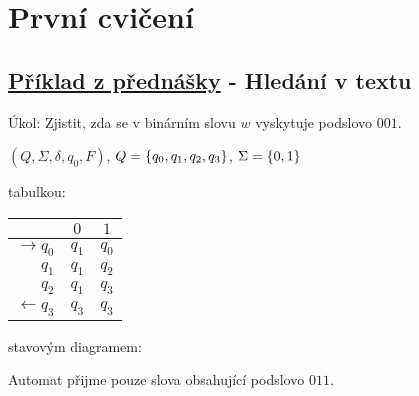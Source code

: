 \section{První cvičení}

\subsection{\href{https://youtu.be/i9kVAPzQyiU?list=PLQL6z4JeTTQkLuzI78OTnfYBclE1g0UjS&t=2918}{Příklad z přednášky} - Hledání v textu}
Úkol: Zjistit, zda se v binárním slovu $w$ vyskytuje podslovo $001$. 

$(Q, \Sigma, \delta, q_0, F)$, $Q = \left\lbrace q_0, q_1, q_2, q_3 \right\rbrace$, $\Sigma = \left\lbrace 0,1 \right\rbrace$ 

\begin{multicols}{2}

    tabulkou: 

    \begin{tabular}{|r|c|c|}
        \hline
        & $0$ & $1$\\
        \hline
        \hline
        $\to q_0$  & $q_1$ & $q_0$\\
        $q_1$      & $q_1$ & $q_2$\\
        $q_2$      & $q_1$ & $q_3$\\
        $\gets q_3$& $q_3$ & $q_3$\\
        \hline
    \end{tabular}
    
    stavovým diagramem:

    
\end{multicols}

Automat přijme pouze slova obsahující podslovo $011$. 

